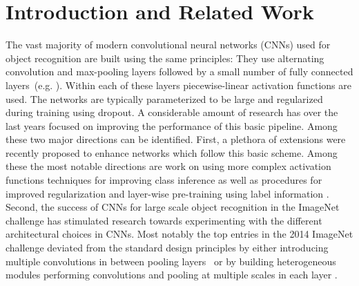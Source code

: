 \documentclass{article} %
\begin{document}
\section{Introduction and Related Work}
The vast majority of modern convolutional neural networks (CNNs) used
for object recognition are built using the same principles: They 
use alternating convolution and max-pooling layers followed by a small number of fully
connected layers~(e.g. \citet{Jarrett_2009,Krizhevsky_NIPS2012,Ciresan_2011}). Within each of these layers piecewise-linear
activation functions are used. The networks are
typically parameterized to be large and regularized during training
using dropout. A considerable amount of research has over the last years 
focused on improving the performance of this basic pipeline. Among
these two major directions can be identified.
%
First, a plethora of extensions were recently proposed to
enhance networks which follow this basic scheme. Among these the most
notable directions are work on using more complex activation functions
\citep{Goodfellow2013,Lin_2014,SrivastavaSchmid_2013} techniques for improving class inference
\citep{Stollenga_2014,Nitish2013} as well as procedures for improved regularization
\citep{ZeilerStochastic2013,SprRied2014a,WanLi2013} and layer-wise pre-training using label information
\citep{Lee_2014}.
%
Second, the success of CNNs for large scale object recognition in the
ImageNet challenge \citep{Krizhevsky_NIPS2012} has stimulated research
towards experimenting with the different architectural choices in
CNNs. Most notably the top entries in the 2014 ImageNet challenge
deviated from the standard design principles by either introducing
multiple convolutions in between pooling layers~\citep{VGG_2014} or by
building heterogeneous modules performing convolutions and pooling at multiple
scales in each layer \citep{GoingDeep_2014}.
\end{document}
